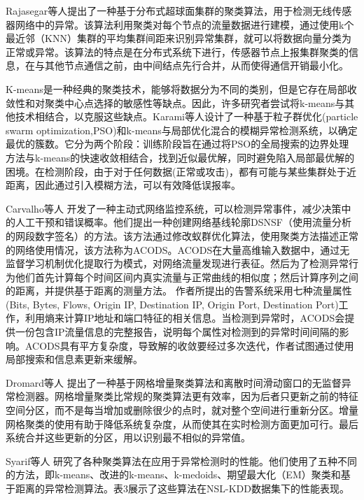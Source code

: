 Rajasegar等人\cite{2014Hyperspherical}提出了一种基于分布式超球面集群的聚类算法，用于检测无线传感器网络中的异常。该算法利用聚类对每个节点的流量数据进行建模，通过使用k个最近邻（KNN）集群的平均集群间距来识别异常集群，就可以将数据向量分类为正常或异常。该算法的特点是在分布式系统下进行，传感器节点上报集群聚类的信息，在与其他节点通信之前，由中间结点先行合并，从而使得通信开销最小化。


K-means是一种经典的聚类技术，能够将数据分为不同的类别，但是它存在局部收敛性和对聚类中心点选择的敏感性等缺点。因此，许多研究者尝试将k-means与其他技术相结合，以克服这些缺点。Karami等人\cite{2015Karami}设计了一种基于粒子群优化(particle swarm optimization,PSO)和k-means与局部优化混合的模糊异常检测系统，以确定最优的簇数。它分为两个阶段：训练阶段旨在通过将PSO的全局搜索的边界处理方法与k-means的快速收敛相结合，找到近似最优解，同时避免陷入局部最优解的困境。在检测阶段，由于对于任何数据(正常或攻击)，都有可能与某些集群处于近距离，因此通过引入模糊方法，可以有效降低误报率。



Carvalho等人\cite{carvalho2016unsupervised} 开发了一种主动式网络监控系统，可以检测异常事件，减少决策中的人工干预和错误概率。他们提出一种创建网络基线轮廓DSNSF（使用流量分析的网段数字签名）的方法。该方法通过修改蚁群优化算法，使用聚类方法描述正常的网络使用情况，该方法称为ACODS。ACODS在大量高维输入数据中，通过无监督学习机制优化提取行为模式，对网络流量发现进行表征。然后为了检测异常行为他们首先计算每个时间区间内真实流量与正常曲线的相似度；然后计算序列之间的距离，并提供基于距离的测量方法。
作者所提出的告警系统采用七种流量属性(Bits, Bytes, Flows, Origin IP, Destination IP, Origin Port, Destination Port)工作，利用熵来计算IP地址和端口特征的相关信息。当检测到异常时，ACODS会提供一份包含IP流量信息的完整报告，说明每个属性对检测到的异常时间间隔的影响。ACODS具有平方复杂度，导致解的收敛要经过多次迭代，作者试图通过使用局部搜索和信息素更新来缓解。

Dromard等人\cite{dromard2016online} 提出了一种基于网格增量聚类算法和离散时间滑动窗口的无监督异常检测器。网格增量聚类比常规的聚类算法更有效率，因为后者只更新之前的特征空间分区，而不是每当增加或删除很少的点时，就对整个空间进行重新分区。增量网格聚类的使用有助于降低系统复杂度，从而使其在实时检测方面更加可行。最后系统合并这些更新的分区，用以识别最不相似的异常值。


Syarif等人\cite{2012syarif} 研究了各种聚类算法在应用于异常检测时的性能。他们使用了五种不同的方法，即k-means、改进的k-means、k-medoids、期望最大化（EM）聚类和基于距离的异常检测算法。表3展示了这些算法在NSL-KDD数据集下的性能表现。

